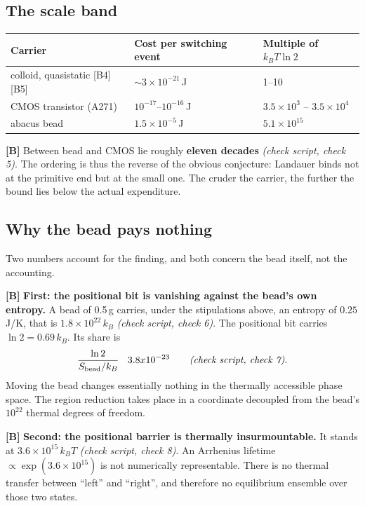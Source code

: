 \subsection{The scale band}

\begin{center}
\small
\begin{tabular}{@{}lll@{}}
\toprule
\textbf{Carrier} & \textbf{Cost per switching event} & \textbf{Multiple of $k_BT\ln 2$} \\
\midrule
colloid, quasistatic [B4][B5] & ${\sim}3\times10^{-21}$\,J & 1--10 \\
CMOS transistor (A271) & $10^{-17}$--$10^{-16}$\,J & $3.5\times10^{3}$ -- $3.5\times10^{4}$ \\
abacus bead & $1.5\times10^{-5}$\,J & $5.1\times10^{15}$ \\
\bottomrule
\end{tabular}
\end{center}

\textbf{[B]} Between bead and CMOS lie roughly \textbf{eleven decades} \emph{(check script, check 5)}. The
ordering is thus the reverse of the obvious conjecture: Landauer binds not at the
primitive end but at the small one. The cruder the carrier, the further the bound
lies below the actual expenditure.

\subsection{Why the bead pays nothing}

Two numbers account for the finding, and both concern the bead itself, not the
accounting.

\textbf{[B]} \textbf{First: the positional bit is vanishing against the bead's own
entropy.} A bead of 0.5\,g carries, under the stipulations above, an entropy of
$0.25$\,J/K, that is $1.8\times10^{22}\,k_B$ \emph{(check script, check 6)}. The positional bit
carries $\ln 2 = 0.69\,k_B$. Its share is
\begin{equation}
  \frac{\ln 2}{S_{\text{bead}}/k_B} \;\approx\; 3.8\times10^{-23}
  \qquad \text{\emph{(check script, check 7)}} .
\end{equation}
Moving the bead changes essentially nothing in the thermally accessible phase
space. The region reduction takes place in a coordinate decoupled from the bead's
$10^{22}$ thermal degrees of freedom.

\textbf{[B]} \textbf{Second: the positional barrier is thermally insurmountable.} It stands
at $3.6\times10^{15}\,k_BT$ \emph{(check script, check 8)}. An Arrhenius lifetime
$\propto \exp(3.6\times10^{15})$ is not numerically representable. There is no
thermal transfer between “left” and “right”, and therefore no equilibrium ensemble
over those two states.

